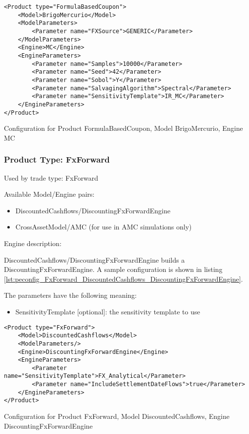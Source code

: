 \begin{longlisting}
\begin{verbatim}
<Product type="FormulaBasedCoupon">
    <Model>BrigoMercurio</Model>
    <ModelParameters>
        <Parameter name="FXSource">GENERIC</Parameter>
    </ModelParameters>
    <Engine>MC</Engine>
    <EngineParameters>
        <Parameter name="Samples">10000</Parameter>
        <Parameter name="Seed">42</Parameter>
        <Parameter name="Sobol">Y</Parameter>
        <Parameter name="SalvagingAlgorithm">Spectral</Parameter>
        <Parameter name="SensitivityTemplate">IR_MC</Parameter>
    </EngineParameters>
</Product>
\end{verbatim}
\caption{Configuration for Product FormulaBasedCoupon, Model BrigoMercurio, Engine MC}
\label{lst:peconfig_FormulaBasedCoupon_BrigoMercurio_MC}
\end{longlisting}

\subsubsection{Product Type: FxForward}

Used by trade type: FxForward

Available Model/Engine pairs:

\begin{itemize}
\item DiscountedCashflows/DiscountingFxForwardEngine
\item CrossAssetModel/AMC (for use in AMC simulations only)
\end{itemize}

Engine description:

DiscountedCashflows/DiscountingFxForwardEngine builds a DiscountingFxForwardEngine. A sample configuration is shown in
listing \ref{lst:peconfig_FxForward_DiscountedCashflows_DiscountingFxForwardEngine}.

The parameters have the following meaning:

\begin{itemize}
\item SensitivityTemplate [optional]: the sensitivity template to use 
\end{itemize}

\begin{longlisting}
\begin{verbatim}
<Product type="FxForward">
    <Model>DiscountedCashflows</Model>
    <ModelParameters/>
    <Engine>DiscountingFxForwardEngine</Engine>
    <EngineParameters>
        <Parameter name="SensitivityTemplate">FX_Analytical</Parameter>
        <Parameter name="IncludeSettlementDateFlows">true</Parameter>
    </EngineParameters>
</Product>
\end{verbatim}
\caption{Configuration for Product FxForward, Model DiscountedCashflows, Engine DiscountingFxForwardEngine}
\label{lst:peconfig_FxForward_DiscountedCashflows_DiscountingFxForwardEngine}
\end{longlisting}

